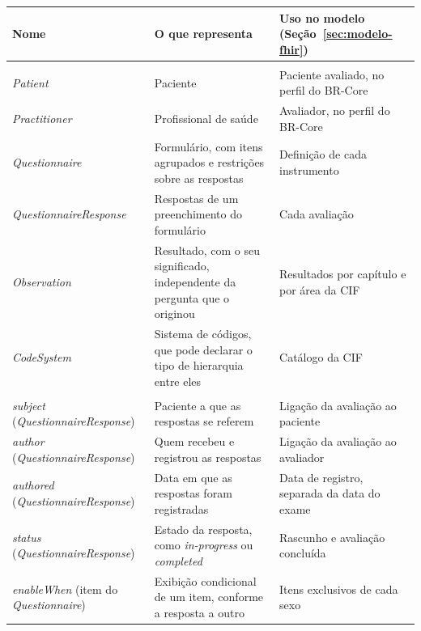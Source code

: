 \begin{quadro}[htb]
	\centering
	\caption{Recursos, elementos e extensões do HL7 FHIR usados no modelo}
	\label{qua:fhir-elementos}
	\footnotesize
	\begin{tabularx}{\textwidth}{|>{\raggedright\arraybackslash}p{}|>{\raggedright\arraybackslash}X|>{\raggedright\arraybackslash}p{}|}
		\hline
		Nome & O que representa & Uso no modelo (Seção~\ref{sec:modelo-fhir}) \\ \hline
		\multicolumn{3}{|l|}{\textbf{Recursos do FHIR R4}} \\ \hline
		\textit{Patient} & Paciente & Paciente avaliado, no perfil do BR-Core \\ \hline
		\textit{Practitioner} & Profissional de saúde & Avaliador, no perfil do BR-Core \\ \hline
		\textit{Questionnaire} & Formulário, com itens agrupados e restrições sobre as respostas & Definição de
			cada instrumento \\ \hline
		\textit{QuestionnaireResponse} & Respostas de um preenchimento do formulário & Cada avaliação \\ \hline
		\textit{Observation} & Resultado, com o seu significado, independente da pergunta que o originou &
			Resultados por capítulo e por área da CIF \\ \hline
		\textit{CodeSystem} & Sistema de códigos, que pode declarar o tipo de hierarquia entre eles & Catálogo da
			CIF \\ \hline
		\multicolumn{3}{|l|}{\textbf{Elementos dos recursos}} \\ \hline
		\textit{subject} (\textit{QuestionnaireResponse}) & Paciente a que as respostas se referem & Ligação da
			avaliação ao paciente \\ \hline
		\textit{author} (\textit{QuestionnaireResponse}) & Quem recebeu e registrou as respostas & Ligação da
			avaliação ao avaliador \\ \hline
		\textit{authored} (\textit{QuestionnaireResponse}) & Data em que as respostas foram registradas & Data de
			registro, separada da data do exame \\ \hline
		\textit{status} (\textit{QuestionnaireResponse}) & Estado da resposta, como \textit{in-progress} ou
			\textit{completed} & Rascunho e avaliação concluída \\ \hline
		\textit{enableWhen} (item do \textit{Questionnaire}) & Exibição condicional de um item, conforme a resposta a
			outro & Itens exclusivos de cada sexo \\ \hline

\end{tabularx}
\end{quadro}
